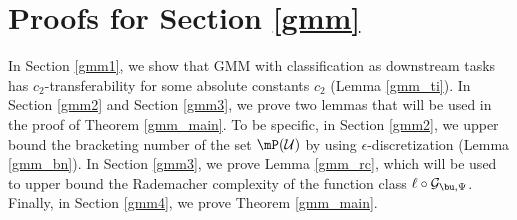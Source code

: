 \section{Proofs for Section \ref{gmm}}
In Section \ref{gmm1}, we show that GMM with classification as downstream tasks has $c_2$-transferability for some absolute constants $c_2$ (Lemma \ref{gmm_ti}). In Section \ref{gmm2} and Section \ref{gmm3}, we prove two lemmas that will be used in the proof of Theorem \ref{gmm_main}. To be specific, in Section \ref{gmm2}, we upper bound the bracketing number of the set $\mP(\mathcal{U})$ by using $\epsilon$-discretization (Lemma \ref{gmm_bn}). In Section \ref{gmm3}, we prove Lemma \ref{gmm_rc}, which will be used to upper bound the Rademacher complexity of the function class $\ell\circ\mathcal{G}_{\bu,\Psi}$. Finally, in Section \ref{gmm4}, we prove Theorem \ref{gmm_main}.




